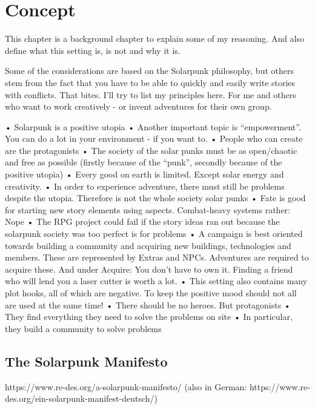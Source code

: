 \chapter{Concept}

This chapter is a background chapter to explain some of my reasoning. And also define what this setting is, is not and why it is.

Some of the considerations are based on the Solarpunk philosophy, but others stem from the fact that
you have to be able to quickly and easily write stories with conflicts. That bites. I'll try to list my principles here. For me and others who want to work creatively - or invent adventures for their own group.

\begin{itemize}
• Solarpunk is a positive utopia
• Another important topic is “empowerment”. You can do a lot in your environment - if you want to.
• People who can create are the protagonists
• The society of the solar punks must be as open/chaotic and free as possible (firstly because of the “punk”, secondly
because of the positive utopia)
• Every good on earth is limited. Except solar energy and creativity.
• In order to experience adventure, there must still be problems despite the utopia. Therefore is not the whole society
solar punks
• Fate is good for starting new story elements using aspects. Combat-heavy systems rather: Nope
• The RPG project could fail if the story ideas ran out because the solarpunk society was too perfect
is for problems
• A campaign is best oriented towards building a community and acquiring new buildings, technologies and
members. These are represented by Extras and NPCs. Adventures are required to acquire these. And under
Acquire: You don't have to own it. Finding a friend who will lend you a laser cutter is worth a lot.
• This setting also contains many plot hooks, all of which are negative. To keep the positive mood should
not all are used at the same time!
• There should be no heroes. But protagonists
• They find everything they need to solve the problems on site
• In particular, they build a community to solve problems
\end{itemize}


\section{The Solarpunk Manifesto}

https://www.re-des.org/a-solarpunk-manifesto/
(also in German: https://www.re-des.org/ein-solarpunk-manifest-deutsch/)

